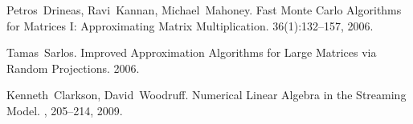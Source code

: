 \documentclass[11pt]{article}
\begin{document}


\begin{thebibliography}{42}
Petros~Drineas, Ravi~Kannan, Michael~Mahoney.
\newblock Fast Monte Carlo Algorithms for Matrices I: Approximating Matrix Multiplication.
 36(1):132–157, 2006.

Tamas~Sarlos.
\newblock Improved Approximation Algorithms for Large Matrices via Random Projections.
 2006.

Kenneth~Clarkson, David~Woodruff.
\newblock Numerical Linear Algebra in the Streaming Model.
, 205--214, 2009.




\end{thebibliography}
\end{document}
